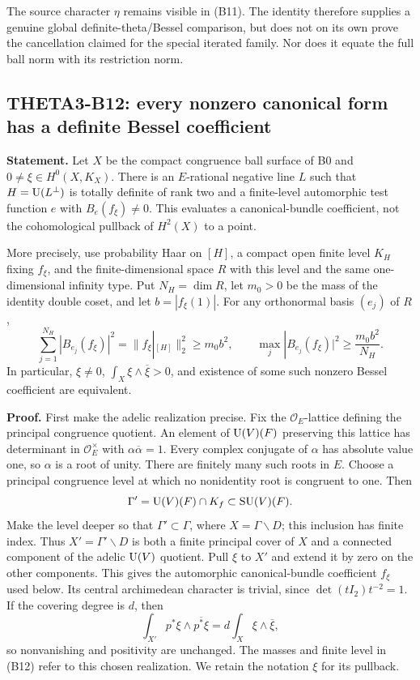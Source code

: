 \documentclass[11pt]{article}
\theoremstyle{definition}\newtheorem{definition}[theorem]{Definition}\newtheorem{remark}[theorem]{Remark}
\begin{document}
The source character $\eta$ remains visible in (B11). The identity therefore supplies a genuine global definite-theta/Bessel comparison, but does not on its own prove the cancellation claimed for the special iterated family. Nor does it equate the full ball norm with its restriction norm.

\subsection{THETA3-B12: every nonzero canonical form has a definite Bessel coefficient}\label{B12}

\textbf{Statement.} Let $X$ be the compact congruence ball surface of B0 and $0\ne\xi\in H^0(X,K_X)$. There is an $E$-rational negative line $L$ such that $H=\operatorname{U}(L^\perp)$ is totally definite of rank two and a finite-level automorphic test function $e$ with $B_e(f_\xi)\ne0$. This evaluates a canonical-bundle coefficient, not the cohomological pullback of $H^2(X)$ to a point.

More precisely, use probability Haar on $[H]$, a compact open finite level $K_H$ fixing $f_\xi$, and the finite-dimensional space $R$ with this level and the same one-dimensional infinity type. Put $N_H=\dim R$, let $m_0>0$ be the mass of the identity double coset, and let $b=|f_\xi(1)|$. For any orthonormal basis $(e_j)$ of $R$,
\[
 \sum_{j=1}^{N_H}|B_{e_j}(f_\xi)|^2
      =\|f_\xi|_{[H]}\|_2^2\geq m_0b^2,
 \qquad
 \max_j|B_{e_j}(f_\xi)|^2\geq\frac{m_0b^2}{N_H}.
 \tag{B12}
\]
In particular, $\xi\ne0$, $\int_X\xi\wedge\overline\xi>0$, and existence of some such nonzero Bessel coefficient are equivalent.

\textbf{Proof.} First make the adelic realization precise. Fix the $\mathcal O_E$-lattice defining the principal congruence quotient. An element of $\operatorname{U}(V)(F)$ preserving this lattice has determinant in $\mathcal O_E^\times$ with $\alpha\overline\alpha=1$. Every complex conjugate of $\alpha$ has absolute value one, so $\alpha$ is a root of unity. There are finitely many such roots in $E$. Choose a principal congruence level at which no nonidentity root is congruent to one. Then
\[
 \Gamma'=\operatorname{U}(V)(F)\cap K_f\subset\operatorname{SU}(V)(F).
\]
Make the level deeper so that $\Gamma'\subset\Gamma$, where $X=\Gamma\backslash D$; this inclusion has finite index. Thus $X'=\Gamma'\backslash D$ is both a finite principal cover of $X$ and a connected component of the adelic $\operatorname{U}(V)$ quotient. Pull $\xi$ to $X'$ and extend it by zero on the other components. This gives the automorphic canonical-bundle coefficient $f_\xi$ used below. Its central archimedean character is trivial, since $\det(tI_2)t^{-2}=1$. If the covering degree is $d$, then
\[
 \int_{X'}p^*\xi\wedge\overline{p^*\xi}
       =d\int_X\xi\wedge\overline\xi,
\]
so nonvanishing and positivity are unchanged. The masses and finite level in (B12) refer to this chosen realization. We retain the notation $\xi$ for its pullback.
\end{document}
